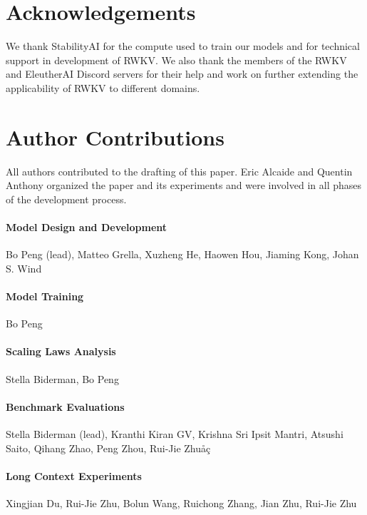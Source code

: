 \documentclass[11pt]{article}
\begin{document}
\section*{Acknowledgements}

We thank StabilityAI for the compute used to train our models and for technical support in development of RWKV. We also thank the members of the RWKV and EleutherAI Discord servers for their help and work on further extending the applicability of RWKV to different domains.




\clearpage
\onecolumn

\appendix

\section{Author Contributions}
All authors contributed to the drafting of this paper. Eric Alcaide and Quentin Anthony organized the paper and its experiments and were involved in all phases of the development process.

\paragraph{Model Design and Development} Bo Peng (lead), Matteo Grella, Xuzheng He, Haowen Hou, Jiaming Kong, Johan S. Wind

\paragraph{Model Training} Bo Peng

\paragraph{Scaling Laws Analysis} Stella Biderman, Bo Peng

\paragraph{Benchmark Evaluations} Stella Biderman (lead), Kranthi Kiran GV, Krishna Sri Ipsit Mantri, Atsushi Saito, Qihang Zhao, Peng Zhou, Rui-Jie Zhuåç

\paragraph{Long Context Experiments} Xingjian Du, Rui-Jie Zhu, Bolun Wang, Ruichong Zhang, Jian Zhu, Rui-Jie Zhu
\end{document}
